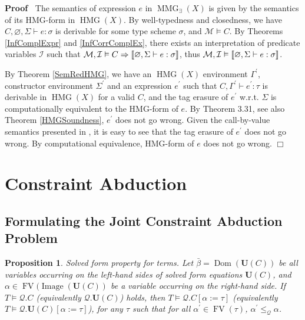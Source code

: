 \documentclass{article}
\newcommand{\assign}{:=}
\newcommand{\tmem}[1]{{\em #1\/}}
\newcommand{\tmmathbf}[1]{\ensuremath{\boldsymbol{#1}}}
\newcommand{\tmop}[1]{\ensuremath{\operatorname{#1}}}
\newenvironment{proof}{\noindent\textbf{Proof\ }}{\hspace*{\fill}$\Box$\medskip}
\newtheorem{proposition}{Proposition}
\begin{document}
\begin{proof}
  The semantics of expression $e$ in $\tmop{MMG}_{\exists} (X)$ is given by
  the semantics of its HMG-form in $\tmop{HMG} (X)$. By well-typedness and
  closedness, we have $C, \varnothing, \Sigma \vdash e : \sigma$ is derivable
  for some type scheme $\sigma$, and $\mathcal{M} \vDash C$. By Theorems
  \ref{InfComplExpr} and \ref{InfCorrComplEx}, there exists an interpretation
  of predicate variables $\mathcal{I}$ such that $\mathcal{M}, \mathcal{I}
  \vDash C \Rightarrow \left\llbracket \varnothing, \Sigma \vdash e :
  {\nobreak} \sigma \right\rrbracket$, thus $\mathcal{M}, \mathcal{I} \vDash
  \left\llbracket \varnothing, \Sigma \vdash e : {\nobreak} \sigma
  \right\rrbracket$.
  
  By Theorem \ref{SemRedHMG}, we have an $\tmop{HMG} (X)$ environment
  $\Gamma^{\prime}$, constructor environment $\Sigma^{\prime}$ and an
  expression $e^{\prime}$ such that $C, \Gamma^{\prime} \vdash e^{\prime} :
  \tau$ is derivable in $\tmop{HMG} (X)$ for a valid $C$, and the tag erasure
  of $e^{\prime}$ w.r.t. $\Sigma$ is computationally equivalent to the
  HMG-form of $e$. By {\cite{simonet-pottier-hmg-toplas}} Theorem 3.31, see
  also Theorem \ref{HMGSoundness}, $e^{\prime}$ does not go wrong. Given the
  call-by-value semantics presented in {\cite{simonet-pottier-hmg-toplas}}, it
  is easy to see that the tag erasure of $e^{\prime}$ does not go wrong. By
  computational equivalence, HMG-form of $e$ does not go wrong.
\end{proof}

\section{Constraint Abduction}

\subsection{Formulating the Joint Constraint Abduction Problem}

\begin{proposition}
  \label{SolvedForm}{\tmem{Solved form property for terms}}. Let $\bar{\beta}
  = \tmop{Dom} (\tmmathbf{U}(C))$ be all variables occurring on the left-hand
  sides of solved form equations $\tmmathbf{U} (C)$, and $\alpha \in \tmop{FV}
  (\tmop{Image} (\tmmathbf{U}(C))$ be a variable occurring on the right-hand
  side. If $T \vDash \mathcal{Q}.C$ (equivalently $\mathcal{Q}.\tmmathbf{U}
  (C)$) holds, then $T \vDash \mathcal{Q}.C [\alpha \assign \tau]$
  (equivalently $T \vDash \mathcal{Q}.\tmmathbf{U} (C) [\alpha \assign
  \tau]$), for any $\tau$ such that for all $\alpha^{\prime} \in \tmop{FV}
  (\tau)$, $\alpha^{\prime} \leqslant_{\mathcal{Q}} \alpha$.
\end{proposition}
\end{document}
